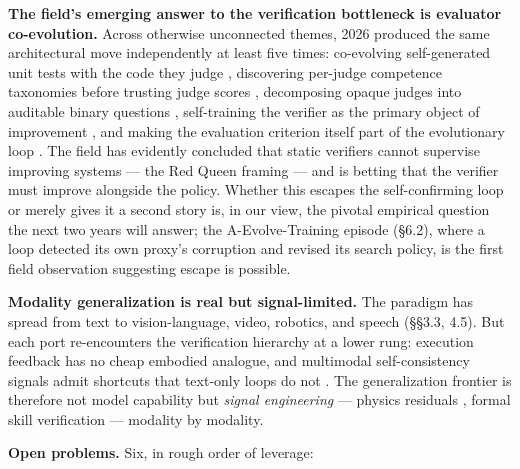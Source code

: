 \documentclass[
  11pt,
]{article}
\begin{document}
\textbf{The field's emerging answer to the verification bottleneck is
evaluator co-evolution.} Across otherwise unconnected themes, 2026
produced the same architectural move independently at least five times:
co-evolving self-generated unit tests with the code they judge
\citep{hu2026cosplay}, discovering per-judge competence taxonomies
before trusting judge scores \citep{cao2026each}, decomposing opaque
judges into auditable binary questions \citep{cho2026ask}, self-training
the verifier as the primary object of improvement \citep{wu2026self},
and making the evaluation criterion itself part of the evolutionary loop
\citep{iacob2026red, zhang2026scientific}. The field has evidently
concluded that static verifiers cannot supervise improving systems ---
the Red Queen framing --- and is betting that the verifier must improve
alongside the policy. Whether this escapes the self-confirming loop or
merely gives it a second story is, in our view, the pivotal empirical
question the next two years will answer; the A-Evolve-Training episode
(§6.2), where a loop detected its own proxy's corruption and revised its
search policy, is the first field observation suggesting escape is
possible.

\textbf{Modality generalization is real but signal-limited.} The
paradigm has spread from text to vision-language, video, robotics, and
speech (§§3.3, 4.5). But each port re-encounters the verification
hierarchy at a lower rung: execution feedback has no cheap embodied
analogue, and multimodal self-consistency signals admit shortcuts that
text-only loops do not \citep{wang2026seeing, venkatraman2026paying}.
The generalization frontier is therefore not model capability but
\emph{signal engineering} --- physics residuals
\citep{hassan2026proprio}, formal skill verification
\citep{yang2026vaso} --- modality by modality.

\textbf{Open problems.} Six, in rough order of leverage:
\end{document}
